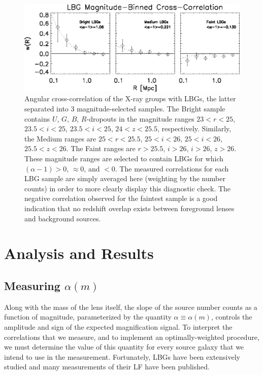 \begin{figure}
\begin{center}
\includegraphics[scale=1.2]{plots_ch2/magbinnedLBGs_multiNFWfit.eps}
\caption[Magnitude-Binned Cross-Correlation]{Angular cross-correlation of the X-ray groups with \ac{LBG}s, the latter separated into 3 magnitude-selected samples.  The Bright sample contains $U$, $G$, $B$, $R$-dropouts in the magnitude ranges $23<r<25$, $23.5<i<25$,  $23.5<i<25$,  $24<z<25.5$, respectively. Similarly, the Medium ranges are $25<r<25.5$, $25<i<26$,  $25<i<26$,  $25.5<z<26$.  The Faint ranges are $r>25.5$, $i>26$,  $i>26$,  $z>26$. These magnitude ranges are selected to contain \ac{LBG}s for which $(\alpha-1)>0$, $\approx 0$, and $<0$.  The measured correlations for each \ac{LBG} sample are simply averaged here (weighting by the number counts) in order to more clearly display this diagnostic check.  The negative correlation observed for the faintest sample is a good indication that no redshift overlap exists between foreground lenses and background sources.}
\label{plot:MagBinned2}
\end{center}
\end{figure}

\section{Analysis and Results}
\label{sec:results2}
\subsection{Measuring $\alpha(m)$}
Along with the mass of the lens itself, the slope of the source number counts as a function of magnitude, parameterized by the quantity $\alpha \equiv \alpha(m)$, controls the amplitude and sign of the expected magnification signal.  To interpret the correlations that we measure, and to implement an optimally-weighted procedure, we must determine the value of this quantity for every source galaxy that we intend to use in the measurement.  Fortunately, \ac{LBG}s have been extensively studied and many measurements of their \ac{LF} have been published.  

